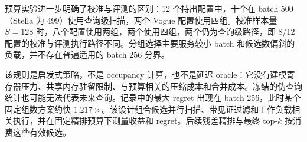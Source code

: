 预算实验进一步明确了校准与评测的区别：12 个持出配置中，十个在 batch 500（Stella 为 499）使用查询级扫描，两个 Vogue 配置使用四组。校准样本量 $S=128$ 时，八个配置使用两组，两个使用四组，两个仍为查询级路径，即 8/12 配置的校准与评测执行路径不同。分组选择主要服务较小 batch 和候选数偏斜的负载，并不存在普遍适用的 batch 256 分界。

该规则是启发式策略，不是 occupancy 计算，也不是延迟 oracle：它没有建模寄存器压力、共享内存驻留限制、与预算相关的压缩成本和合并成本。冻结的伪查询统计也可能无法代表未来查询。记录中的最大 regret 出现在 batch 256，此时某个固定组数方案约快 $1.217\times$。该设计组合候选并行扫描、带见证过滤和工作负载相关执行，并在固定精排预算下测量收益和 regret。后续残差精排与最终 top-$k$ 按消费这些有效候选。
